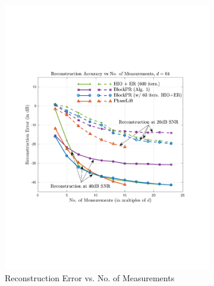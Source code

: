 %
\begin{figure}[hbtp]
\centering
\begin{subfigure}[b]{0.495\textwidth}
\centering
\includegraphics[clip=true, trim = 0.5in 2.5in 0.75in 2.5in,scale=0.45]{pics/fig5a}
\caption{Reconstruction Error vs. No. of Measurements}
\label{fig:measurements}
\end{subfigure}
\hfill
\begin{subfigure}[b]{0.495\textwidth}
\centering

\end{subfigure}
\end{figure}
